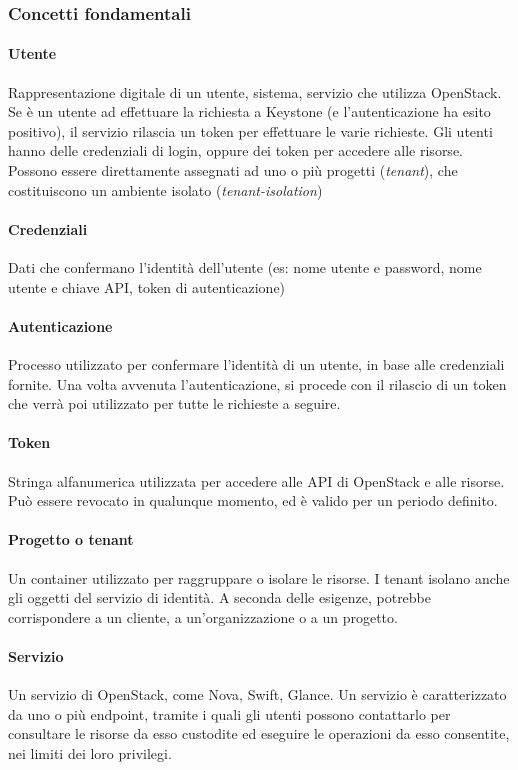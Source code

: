 \subsubsection{Concetti fondamentali}

\paragraph{Utente}
Rappresentazione digitale di un utente, sistema, servizio che utilizza OpenStack.
Se è un utente ad effettuare la richiesta a Keystone (e l'autenticazione ha esito positivo), il servizio rilascia un token per effettuare le varie richieste.
Gli utenti hanno delle credenziali di login, oppure dei token per accedere alle risorse.
Possono essere direttamente assegnati ad uno o più progetti (\textit{tenant}), che costituiscono un ambiente isolato (\textit{tenant-isolation})
\paragraph{Credenziali}
Dati che confermano l'identità dell'utente (es: nome utente e password, nome utente e chiave API, token di autenticazione)
\paragraph{Autenticazione}
Processo utilizzato per confermare l'identità di un utente, in base alle credenziali fornite.
Una volta avvenuta l'autenticazione, si procede con il rilascio di un token che verrà poi utilizzato per tutte le richieste a seguire.
\paragraph{Token}
Stringa alfanumerica utilizzata per accedere alle API di OpenStack e alle risorse. Può essere revocato in qualunque momento, ed è valido per un periodo definito.
\paragraph{Progetto o tenant}
Un container utilizzato per raggruppare o isolare le risorse. I tenant isolano anche gli oggetti del servizio di identità.
A seconda delle esigenze, potrebbe corrispondere a un cliente, a un'organizzazione o a un progetto.
\paragraph{Servizio}
Un servizio di OpenStack, come Nova, Swift, Glance. Un servizio è caratterizzato da uno o più endpoint, tramite i quali gli utenti possono contattarlo per consultare le risorse da esso custodite ed eseguire le operazioni da esso consentite, nei limiti dei loro privilegi.
